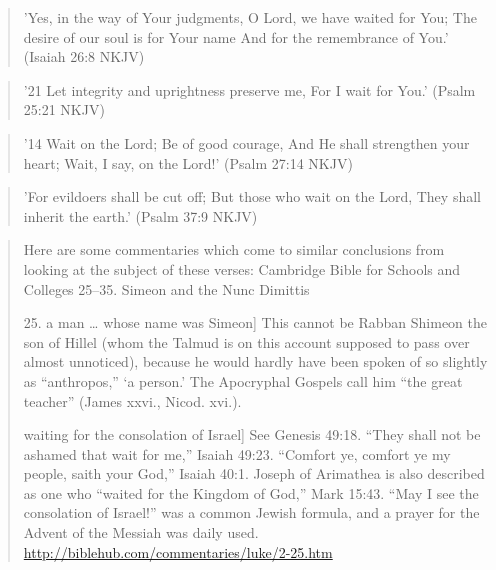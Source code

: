 \documentclass[11pt]{article}
\begin{document}
\begin{quote}
'Yes, in the way of Your judgments,
O Lord, we have waited for You;
The desire of our soul is for Your name
And for the remembrance of You.'
(Isaiah 26:8 NKJV)
\end{quote}
\begin{quote}
'21 Let integrity and uprightness preserve me,
For I wait for You.'
(Psalm 25:21 NKJV)
\end{quote}
\begin{quote}
'14 Wait on the Lord;
Be of good courage,
And He shall strengthen your heart;
Wait, I say, on the Lord!'
(Psalm 27:14 NKJV)
\end{quote}
\begin{quote}
'For evildoers shall be cut off;
But those who wait on the Lord,
They shall inherit the earth.'
(Psalm 37:9 NKJV)
\end{quote}
\begin{quote}
Here are some commentaries which come to similar conclusions from looking at the subject of these verses: \newline
Cambridge Bible for Schools and Colleges
25–35. Simeon and the Nunc Dimittis

25. a man … whose name was Simeon] This cannot be Rabban Shimeon the son of Hillel (whom the Talmud is on this account supposed to pass over almost unnoticed), because he would hardly have been spoken of so slightly as “anthropos,” ‘a person.’ The Apocryphal Gospels call him “the great teacher” (James xxvi., Nicod. xvi.).

waiting for the consolation of Israel] See Genesis 49:18. “They shall not be ashamed that wait for me,” Isaiah 49:23. “Comfort ye, comfort ye my people, saith your God,” Isaiah 40:1. Joseph of Arimathea is also described as one who “waited for the Kingdom of God,” Mark 15:43. “May I see the consolation of Israel!” was a common Jewish formula, and a prayer for the Advent of the Messiah was daily used. \url{http://biblehub.com/commentaries/luke/2-25.htm}
\end{quote}
\end{document}
